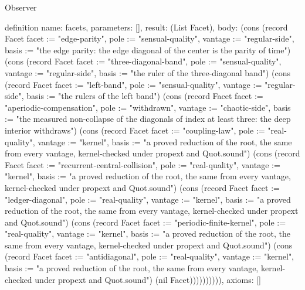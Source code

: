 \begin{lexlean}{Observer}
\begin{semanticmodule}
definition{
  name: facets,
  parameters: [],
  result: (List Facet),
  body: (cons (record Facet {facet := "edge-parity", pole := "sensual-quality", vantage := "regular-side", basis := "the edge parity: the edge diagonal of the center is the parity of time"}) (cons (record Facet {facet := "three-diagonal-band", pole := "sensual-quality", vantage := "regular-side", basis := "the ruler of the three-diagonal band"}) (cons (record Facet {facet := "left-band", pole := "sensual-quality", vantage := "regular-side", basis := "the rulers of the left band"}) (cons (record Facet {facet := "aperiodic-compensation", pole := "withdrawn", vantage := "chaotic-side", basis := "the measured non-collapse of the diagonals of index at least three: the deep interior withdraws"}) (cons (record Facet {facet := "coupling-law", pole := "real-quality", vantage := "kernel", basis := "a proved reduction of the root, the same from every vantage, kernel-checked under propext and Quot.sound"}) (cons (record Facet {facet := "recurrent-central-collision", pole := "real-quality", vantage := "kernel", basis := "a proved reduction of the root, the same from every vantage, kernel-checked under propext and Quot.sound"}) (cons (record Facet {facet := "ledger-diagonal", pole := "real-quality", vantage := "kernel", basis := "a proved reduction of the root, the same from every vantage, kernel-checked under propext and Quot.sound"}) (cons (record Facet {facet := "periodic-finite-kernel", pole := "real-quality", vantage := "kernel", basis := "a proved reduction of the root, the same from every vantage, kernel-checked under propext and Quot.sound"}) (cons (record Facet {facet := "antidiagonal", pole := "real-quality", vantage := "kernel", basis := "a proved reduction of the root, the same from every vantage, kernel-checked under propext and Quot.sound"}) (nil Facet)))))))))),
  axioms: []
}


\end{semanticmodule}
\end{lexlean}
